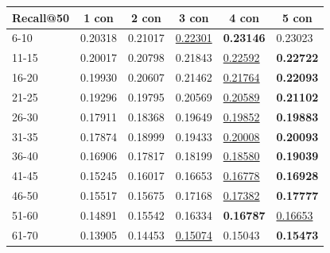 \begin{table}[]
    \centering
    \begin{tabular}{|l|l|l|l|l|l|}
        \hline
        Recall@50 & \multicolumn{1}{c|}{1 con} & \multicolumn{1}{c|}{2 con} & \multicolumn{1}{c|}{3 con} & \multicolumn{1}{c|}{4 con} & \multicolumn{1}{c|}{5 con} \\ \hline
        6-10      & 0.20318                    & 0.21017                    & \underline{0.22301}        & \textbf{0.23146}           & 0.23023                    \\ \hline
        11-15     & 0.20017                    & 0.20798                    & 0.21843                    & \underline{0.22592}        & \textbf{0.22722}           \\ \hline
        16-20     & 0.19930                    & 0.20607                    & 0.21462                    & \underline{0.21764}        & \textbf{0.22093}           \\ \hline
        21-25     & 0.19296                    & 0.19795                    & 0.20569                    & \underline{0.20589}        & \textbf{0.21102}           \\ \hline
        26-30     & 0.17911                    & 0.18368                    & 0.19649                    & \underline{0.19852}        & \textbf{0.19883}           \\ \hline
        31-35     & 0.17874                    & 0.18999                    & 0.19433                    & \underline{0.20008}        & \textbf{0.20093}           \\ \hline
        36-40     & 0.16906                    & 0.17817                    & 0.18199                    & \underline{0.18580}        & \textbf{0.19039}           \\ \hline
        41-45     & 0.15245                    & 0.16017                    & 0.16653                    & \underline{0.16778}        & \textbf{0.16928}           \\ \hline
        46-50     & 0.15517                    & 0.15675                    & 0.17168                    & \underline{0.17382}        & \textbf{0.17777}           \\ \hline
        51-60     & 0.14891                    & 0.15542                    & 0.16334                    & \textbf{0.16787}           & \underline{0.16653}        \\ \hline
        61-70     & 0.13905                    & 0.14453                    & \underline{0.15074}        & 0.15043                    & \textbf{0.15473}           \\ \hline

\end{tabular}
\end{table}

